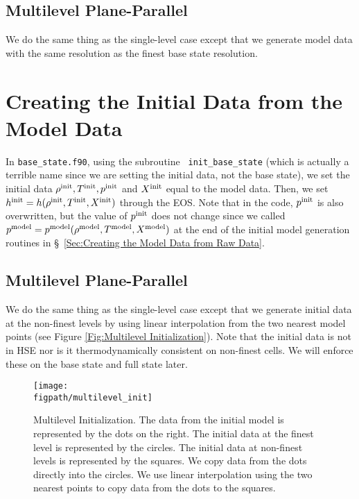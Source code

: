 \subsection{Multilevel Plane-Parallel}
We do the same thing as the single-level case except that we generate
model data with the same resolution as the finest base state
resolution.


\section{Creating the Initial Data from the Model Data}
In {\tt base\_state.f90}, using the subroutine {\tt
  init\_base\_state} (which is actually a terrible name since we
are setting the initial data, not the base state), we set the initial
data $\rho^{\rm init}, T^{\rm init}, p^{\rm init}$ and $X^{\rm init}$ equal to the
model data.  Then, we set $h^{\rm init} =
h(\rho^{\rm init},T^{\rm init},X^{\rm init})$ through the EOS.  Note that in the code,
$p^{\rm init}$ is also overwritten, but the value of $p^{\rm init}$ does not
change since we called $p^{\rm model} =
p^{\rm model}(\rho^{\rm model},T^{\rm model},X^{\rm model})$ at the end of the
initial model generation routines in \S~\ref{Sec:Creating the Model Data from Raw
  Data}.

\subsection{Multilevel Plane-Parallel}
We do the same thing as the single-level case except that we generate
initial data at the non-finest levels by using linear interpolation
from the two nearest model points (see Figure \ref{Fig:Multilevel
  Initialization}).  Note that the initial data is not in HSE nor is
it thermodynamically consistent on non-finest cells.  We will enforce
these on the base state and full state later.
\begin{figure}[tpb]
\centering
\texttt{[image: \\figpath/multilevel\_init]}\hspace{0.2in}
\begin{minipage}[b]{5.0in}
\caption[Multi-level initial model initialization]
 {Multilevel Initialization.  The data from the initial model
  is represented by the dots on the right.  The initial data at the
  finest level is represented by the circles.  The initial data at
  non-finest levels is represented by the squares.  We copy data from
  the dots directly into the circles.  We use linear interpolation
  using the two nearest points to copy data from the dots to the
  squares.\vspace{2em}}
\end{minipage}
\label{Fig:Multilevel Initialization}
\end{figure}


